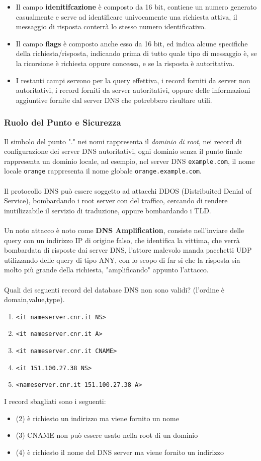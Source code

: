\documentclass[12pt, letterpaper]{article}
\newcommand{\code}[1]{\colorbox{light-gray}{\texttt{#1}}}
\newcommand{\acc}{\\\hphantom{}\\}
\begin{document}
\begin{itemize}
    \item Il campo \textbf{idenitifcazione} è composto da 16 bit, contiene un numero generato casualmente
          e serve ad identificare univocamente una richiesta attiva, il messaggio di risposta conterrà lo stesso
          numero identificativo.
    \item Il campo \textbf{flags} è composto anche esso da 16 bit, ed indica alcune specifiche della
          richiesta/risposta, indicando prima di tutto quale  tipo di messaggio è, se la ricorsione è richiesta
          oppure concessa, e se la risposta è autoritativa.
    \item I restanti campi servono per la query effettiva, i record forniti 
    da server non autoritativi, i record forniti da server
          autoritativi, oppure delle informazioni aggiuntive fornite dal server DNS che potrebbero risultare utili.
\end{itemize}
\subsubsection{Ruolo del Punto e Sicurezza}
Il simbolo del punto "." nei nomi rappresenta il \textit{dominio di root}, nei record di configurazione
dei server DNS autoritativi, ogni dominio senza il punto finale rappresenta un dominio locale, ad esempio,
nel server DNS \code{example.com}, il nome locale \code{orange} rappresenta il nome
globale \code{orange.example.com}.\acc
Il protocollo DNS può essere soggetto ad attacchi DDOS (Distribuited Denial of Service), bombardando i
root server con del traffico, cercando di rendere inutilizzabile il servizio di traduzione, oppure
bombardando i TLD.\acc
Un noto attacco è noto come \textbf{DNS Amplification}, consiste nell'inviare delle query con un indirizzo
IP di origine falso, che identifica la vittima, che verrà bombardata di risposte dai server DNS, l'attore malevolo
manda pacchetti UDP utilizzando delle query di tipo ANY, con lo scopo di far si che la risposta sia
molto più grande della richiesta, "amplificando" appunto l'attacco.\acc
Quali dei seguenti record del database DNS non sono validi? (l'ordine è domain,value,type).\begin{enumerate}
    \item \code{<it nameserver.cnr.it NS>}
    \item \code{<it nameserver.cnr.it A>}
    \item \code{<it nameserver.cnr.it CNAME>}
    \item \code{<it 151.100.27.38 NS>}
    \item \code{<nameserver.cnr.it 151.100.27.38 A>}
\end{enumerate}
I record sbagliati sono i seguenti:\begin{itemize}
    \item \color{red}(2) \color{black} è richiesto un indirizzo ma viene fornito un nome
    \item  \color{red}(3) \color{black} CNAME non può essere usato nella root di un dominio
    \item \color{red}(4) \color{black} è richiesto il nome del DNS server ma viene fornito un indirizzo
\end{itemize}
\end{document}
